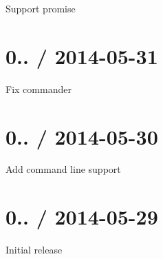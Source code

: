 \begin{DoxyItemize}
\item Support promise
\end{DoxyItemize}

\section*{0.. / 2014-\/05-\/31}


\begin{DoxyItemize}
\item Fix commander
\end{DoxyItemize}

\section*{0.. / 2014-\/05-\/30}


\begin{DoxyItemize}
\item Add command line support
\end{DoxyItemize}

\section*{0.. / 2014-\/05-\/29}


\begin{DoxyItemize}
\item Initial release 
\end{DoxyItemize}